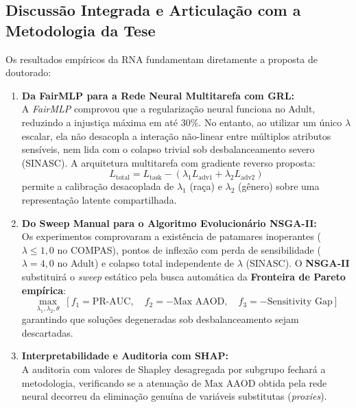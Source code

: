 \subsection{Discussão Integrada e Articulação com a Metodologia da Tese}
\label{subsec:discussao_metodologia}

Os resultados empíricos da RNA fundamentam diretamente a proposta de doutorado:
\begin{enumerate}
    \item \textbf{Da FairMLP para a Rede Neural Multitarefa com GRL:} \\
    A \textit{FairMLP} comprovou que a regularização neural funciona no Adult, reduzindo a injustiça máxima em até $30\%$. No entanto, ao utilizar um único $\lambda$ escalar, ela não desacopla a interação não-linear entre múltiplos atributos sensíveis, nem lida com o colapso trivial sob desbalanceamento severo (SINASC). A arquitetura multitarefa com gradiente reverso proposta:
    \begin{equation}
    L_{\text{total}} = L_{\text{task}} - \left( \lambda_1 L_{\text{adv1}} + \lambda_2 L_{\text{adv2}} \right)
    \end{equation}
    permite a calibração desacoplada de $\lambda_1$ (raça) e $\lambda_2$ (gênero) sobre uma representação latente compartilhada.

    \item \textbf{Do Sweep Manual para o Algoritmo Evolucionário NSGA-II:} \\
    Os experimentos comprovaram a existência de patamares inoperantes ($\lambda \le 1,0$ no COMPAS), pontos de inflexão com perda de sensibilidade ($\lambda = 4,0$ no Adult) e colapso total independente de $\lambda$ (SINASC). O \textbf{NSGA-II} substituirá o \textit{sweep} estático pela busca automática da \textbf{Fronteira de Pareto empírica}:
    \begin{equation}
    \max_{\lambda_1, \lambda_2, \theta} \; \left[ f_1 = \text{PR-AUC}, \quad f_2 = -\text{Max AAOD}, \quad f_3 = -\text{Sensitivity Gap} \right]
    \end{equation}
    garantindo que soluções degeneradas sob desbalanceamento sejam descartadas.

    \item \textbf{Interpretabilidade e Auditoria com SHAP:} \\
    A auditoria com valores de Shapley desagregada por subgrupo fechará a metodologia, verificando se a atenuação de $\text{Max AAOD}$ obtida pela rede neural decorreu da eliminação genuína de variáveis substitutas (\textit{proxies}).
\end{enumerate}
